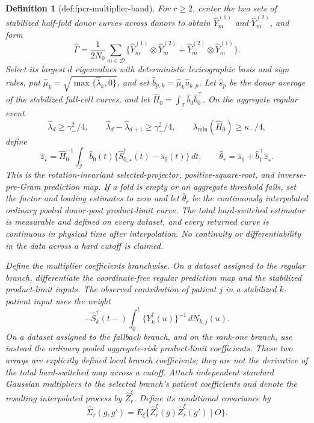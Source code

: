 \documentclass{article}
\newtheorem{definition}{Definition}
\begin{document}
\begin{definition}[def:fpcr-multiplier-band]
For \(r\ge2\), center the two sets of stabilized half-fold donor curves across donors to obtain \(\widehat Y_m^{(1)}\) and \(\widehat Y_m^{(2)}\), and form
\[
 \widehat\Gamma=\frac{1}{2N_0}\sum_{m\in\mathcal D}
 \{\widehat Y_m^{(1)}\otimes\widehat Y_m^{(2)}+
   \widehat Y_m^{(2)}\otimes\widehat Y_m^{(1)}\}.
\]
Select its largest \(d\) eigenvalues with deterministic lexicographic basis and sign rules, put \(\widehat\mu_k=\sqrt{\max\{\widehat\lambda_k,0\}}\), and set \(\widehat b_{p,k}=\widehat\mu_k\widehat u_{k,p}\). Let \(\widehat s_p\) be the donor average of the stabilized full-cell curves, and let \(\widehat H_0=\int_{\mathcal I}\widehat b_0\widehat b_0^\top\). On the aggregate regular event
\[
 \widehat\lambda_d\ge\gamma_-^2/4,\qquad
 \widehat\lambda_d-\widehat\lambda_{d+1}\ge\gamma_-^2/4,
 \qquad \lambda_{\min}(\widehat H_0)\ge\kappa_-/4,
\]
define
\[
 \widehat z_\star=\widehat H_0^{-1}\int_{\mathcal I}\widehat b_0(t)
 \{\widehat S_{0,\star}^\dagger(t)-\widehat s_0(t)\}\,dt,
 \qquad
 \widehat\theta_r=\widehat s_1+\widehat b_1^\top\widehat z_\star.
\]
This is the rotation-invariant selected-projector, positive-square-root, and inverse-pre-Gram prediction map. If a fold is empty or an aggregate threshold fails, set the factor and loading estimates to zero and let \(\widehat\theta_r\) be the continuously interpolated ordinary pooled donor-post product-limit curve. The total hard-switched estimator is measurable and defined on every dataset, and every returned curve is continuous in physical time after interpolation. No continuity or differentiability in the data across a hard cutoff is claimed.

Define the multiplier coefficients branchwise. On a dataset assigned to the regular branch, differentiate the coordinate-free regular prediction map and the stabilized product-limit inputs. The observed contribution of patient \(j\) in a stabilized \(k\)-patient input uses the weight
\[
 -\widehat S_k^\dagger(t-)
 \int_0^t\{Y_k^\dagger(u)\}^{-1}\,dN_{k,j}(u).
\]
On a dataset assigned to the fallback branch, and on the rank-one branch, use instead the ordinary pooled aggregate-risk product-limit coefficients. These two arrays are explicitly defined local branch coefficients; they are not the derivative of the total hard-switched map across a cutoff. Attach independent standard Gaussian multipliers to the selected branch's patient coefficients and denote the resulting interpolated process by \(\widehat Z_r^\xi\). Define its conditional covariance by
\[
 \widehat\Sigma_r(g,g')
 =E_\xi\{\widehat Z_r^\xi(g)\widehat Z_r^\xi(g')\mid O\}.
\]


\end{definition}
\end{document}
